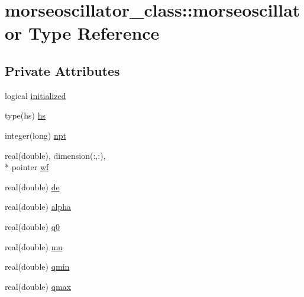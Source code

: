\hypertarget{structmorseoscillator__class_1_1morseoscillator}{\section{morseoscillator\+\_\+class\+:\+:morseoscillator Type Reference}
\label{structmorseoscillator__class_1_1morseoscillator}
}
\subsection*{Private Attributes}
\begin{DoxyCompactItemize}
\item 
logical \hyperlink{structmorseoscillator__class_1_1morseoscillator_ad10bf829e062909dcf0961428d1e1f63}{initialized}
\item 
type(hs) \hyperlink{structmorseoscillator__class_1_1morseoscillator_ab9831e282d966be6588e016820a8c712}{hs}
\item 
integer(long) \hyperlink{structmorseoscillator__class_1_1morseoscillator_a0fe43e1214f509631689d2d962850696}{npt}
\item 
real(double), dimension(\+:,\+:), \\*
pointer \hyperlink{structmorseoscillator__class_1_1morseoscillator_aaf0cdada0b811286eae65966d0773688}{wf}
\item 
real(double) \hyperlink{structmorseoscillator__class_1_1morseoscillator_a0a31e14137f64b9d201d58ffcda2dc29}{de}
\item 
real(double) \hyperlink{structmorseoscillator__class_1_1morseoscillator_a8a29db7406bfe4a92e769bedb53ca906}{alpha}
\item 
real(double) \hyperlink{structmorseoscillator__class_1_1morseoscillator_a622be648b06b27ffbb9618b24dee3a2c}{q0}
\item 
real(double) \hyperlink{structmorseoscillator__class_1_1morseoscillator_a90f0dd72ffa7a68cf49debb062ac18aa}{mu}
\item 
real(double) \hyperlink{structmorseoscillator__class_1_1morseoscillator_afd9b3f7f865c19c374e0d36dcf8350b7}{qmin}
\item 
real(double) \hyperlink{structmorseoscillator__class_1_1morseoscillator_aacdcf4945d001cbe864731ca80788984}{qmax}
\end{DoxyCompactItemize}


